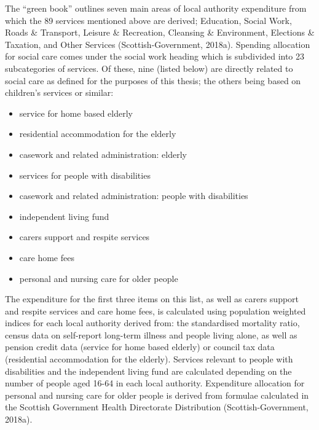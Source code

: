\documentclass[12pt,a4paper,oneside,table]{report}
\begin{document}
The ``green book'' outlines seven main areas of local authority
expenditure from which the 89 services mentioned above are derived;
Education, Social Work, Roads \& Transport, Leisure \& Recreation,
Cleansing \& Environment, Elections \& Taxation, and Other Services
(Scottish-Government, 2018a). Spending allocation for social care comes
under the social work heading which is subdivided into 23 subcategories
of services. Of these, nine (listed below) are directly related to
social care as defined for the purposes of this thesis; the others being
based on children's services or similar:

\begin{itemize}[noitemsep]
\item service for home based elderly
\item residential accommodation for the elderly
\item casework and related administration: elderly
\item services for people with disabilities
\item casework and related administration: people with disabilities
\item independent living fund
\item carers support and respite services
\item care home fees
\item personal and nursing care for older people
\end{itemize}

The expenditure for the first three items on this list, as well as
carers support and respite services and care home fees, is calculated
using population weighted indices for each local authority derived from:
the standardised mortality ratio, census data on self-report long-term
illness and people living alone, as well as pension credit data (service
for home based elderly) or council tax data (residential accommodation
for the elderly). Services relevant to people with disabilities and the
independent living fund are calculated depending on the number of people
aged 16-64 in each local authority. Expenditure allocation for personal
and nursing care for older people is derived from formulae calculated in
the Scottish Government Health Directorate Distribution
(Scottish-Government, 2018a).
\end{document}
